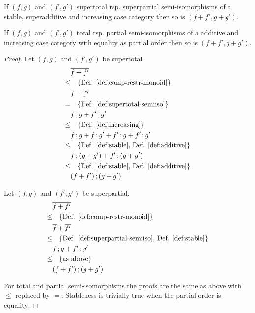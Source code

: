 \documentclass[runningheads,envcountsame]{llncs}
\begin{document}
\begin{lemma}
    If $(f, g)$ and $(f', g')$ supertotal rsp. superpartial semi-isomorphisms of a stable, superadditive and increasing case category then so is $(f + f', g + g')$.
    
    If $(f, g)$ and $(f', g')$ total rsp. partial semi-isomorphisms of a additive and increasing case category with equality as partial order then so is $(f + f', g + g')$. 
\end{lemma}
\begin{proof}
    Let $(f, g)$ and $(f', g')$ be supertotal.
    \begin{align}
        & \overline{f + f'} \\
    \leq & \quad\text{\{Def. \ref{def:comp-restr-monoid}\}} \\
        & \overline{f} + \overline{f'} \\
    = & \quad\text{\{Def. \ref{def:supertotal-semiiso}\}} \\
        & \comp{f}{g} + \comp{f'}{g'} \\
    \leq & \quad\text{\{Def. \ref{def:increasing}\}} \\
        & \comp{f}{g} + \comp{f}{g'} + \comp{f'}{g} + \comp{f'}{g'} \\
    \leq & \quad\text{\{Def. \ref{def:stable}, Def. \ref{def:additive}\}} \\
        & \comp{f}{(g + g')} + \comp{f'}{(g + g')} \\
    \leq & \quad\text{\{Def. \ref{def:stable}, Def. \ref{def:additive}\}} \\
        & \comp{(f + f')}{(g + g')}
    \end{align}
    
    Let $(f, g)$ and $(f', g')$ be superpartial.
    \begin{align}
        & \overline{f + f'} \\
    \leq   & \quad\text{\{Def. \ref{def:comp-restr-monoid}\}} \\
        & \overline{f} + \overline{f'} \\
    \leq & \quad\text{\{Def. \ref{def:superpartial-semiiso}, Def. \ref{def:stable}\}} \\
        & \comp{f}{g} + \comp{f'}{g'} \\
    \leq & \quad\text{\{as above\}} \\
        & \comp{(f + f')}{(g + g')}
    \end{align}
    
    For total and partial semi-isomorphisms the proofs are the same as above with $\leq$ replaced by $=$. Stableness is trivially true when the partial order is equality.
\end{proof}
\end{document}
